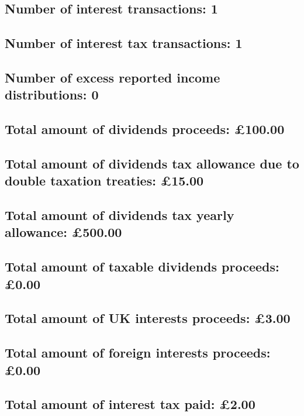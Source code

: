 \documentclass{article}
\begin{document}
\subsection*{Number of interest transactions: 1}
\subsection*{Number of interest tax transactions: 1}
\subsection*{Number of excess reported income distributions: 0}
\subsection*{Total amount of dividends proceeds: £100.00}
\subsection*{Total amount of dividends tax allowance due to double taxation treaties: £15.00}
\subsection*{Total amount of dividends tax yearly allowance: £500.00}
\subsection*{Total amount of taxable dividends proceeds: £0.00}
\subsection*{Total amount of UK interests proceeds: £3.00}
\subsection*{Total amount of foreign interests proceeds: £0.00}
\subsection*{Total amount of interest tax paid: £2.00}
\end{document}

